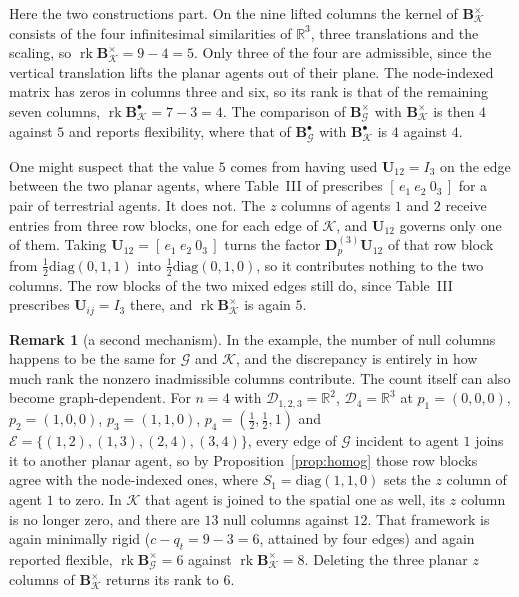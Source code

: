 \documentclass[11pt,a4paper]{article}
\theoremstyle{plain}
\theoremstyle{definition}
\newtheorem{remark}{Remark}
\newcommand{\R}{\mathbb{R}}
\newcommand{\rank}{\operatorname{rk}}
\newcommand{\Bper}{\mathbf{B}^{\times}}
\newcommand{\Bnode}{\mathbf{B}^{\bullet}}
\newcommand{\Dp}{\mathbf{D}_p}
\begin{document}
Here the two constructions part. On the nine lifted columns the kernel of
$\Bper_{\mathcal K}$ consists of the four infinitesimal similarities of $\R^3$,
three translations and the scaling, so $\rank\Bper_{\mathcal K}=9-4=5$. Only
three of the four are admissible, since the vertical translation lifts the
planar agents out of their plane. The node-indexed matrix has zeros in columns
three and six, so its rank is that of the remaining seven columns,
$\rank\Bnode_{\mathcal K}=7-3=4$. The comparison of $\Bper_{\mathcal G}$ with $\Bper_{\mathcal K}$ is then $4$
against $5$ and reports flexibility, where that of $\Bnode_{\mathcal G}$ with
$\Bnode_{\mathcal K}$ is $4$ against $4$.

One might suspect that the value $5$ comes from having used
$\mathbf U_{12}=I_3$ on the edge between the two planar agents, where
Table~III of \cite{michieletto2021} prescribes $[\,e_1\ e_2\ 0_3\,]$ for a pair
of terrestrial agents. It does not. The $z$ columns of agents $1$ and $2$
receive entries from three row blocks, one for each edge of $\mathcal K$, and
$\mathbf U_{12}$ governs only one of them. Taking
$\mathbf U_{12}=[\,e_1\ e_2\ 0_3\,]$ turns the factor
$\Dp^{(3)}\mathbf U_{12}$ of that row block from
$\tfrac12\mathrm{diag}(0,1,1)$ into $\tfrac12\mathrm{diag}(0,1,0)$, so it
contributes nothing to the two columns. The row blocks of the two mixed edges
still do, since Table~III prescribes $\mathbf U_{ij}=I_3$ there, and
$\rank\Bper_{\mathcal K}$ is again $5$.

\begin{remark}[a second mechanism]
In the example, the number of null columns happens to be the same for
$\mathcal G$ and $\mathcal K$, and the discrepancy is entirely in how much rank
the nonzero inadmissible columns contribute. The count itself can also become
graph-dependent. For $n=4$ with $\mathcal D_{1,2,3}=\R^2$,
$\mathcal D_4=\R^3$ at $p_1=(0,0,0)$, $p_2=(1,0,0)$, $p_3=(1,1,0)$,
$p_4=(\tfrac12,\tfrac12,1)$ and $\mathcal E=\{(1,2),(1,3),(2,4),(3,4)\}$, every
edge of $\mathcal G$ incident to agent $1$ joins it to another planar agent, so
by Proposition~\ref{prop:homog} those row blocks agree with the node-indexed
ones, where $S_1=\mathrm{diag}(1,1,0)$ sets the $z$ column of agent $1$ to
zero. In $\mathcal K$ that agent is joined to the spatial one as well, its $z$
column is no longer zero, and there are $13$ null columns against $12$. That framework is again minimally rigid ($c-q_t=9-3=6$,
attained by four edges) and again reported flexible,
$\rank\Bper_{\mathcal G}=6$ against $\rank\Bper_{\mathcal K}=8$. Deleting the
three planar $z$ columns of $\Bper_{\mathcal K}$ returns its rank to $6$.
\end{remark}
\end{document}
